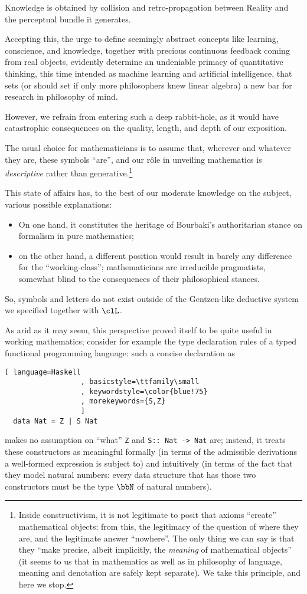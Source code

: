 Knowledge is obtained by collision and retro-propagation between Reality and the perceptual bundle it generates.

Accepting this, the urge to define seemingly abstract concepts like learning, conscience, and knowledge, together with precious continuous feedback coming from real objects, evidently determine an undeniable primacy of quantitative thinking, this time intended as machine learning and artificial intelligence, that sets (or should set if only more philosophers knew linear algebra) a new bar for research in philosophy of mind.

However, we refrain from entering such a deep rabbit-hole, as it would have catastrophic consequences on the quality, length, and depth of our exposition.

The usual choice for mathematicians is to assume that, wherever and whatever they are, these symbols ``are'', and our r\^ole in unveiling mathematics is \emph{descriptive} rather than generative.\footnote{Inside constructivism, it is not legitimate to posit that axioms ``create'' mathematical objects; from this, the legitimacy of the question of where they are, and the legitimate answer ``nowhere''. The only thing we can say is that they ``make precise, albeit implicitly, the \emph{meaning} of mathematical objects'' \cite[]{agazzi} (it seems to us that in mathematics as well as in philosophy of language, meaning and denotation are safely kept separate). We take this principle, and here we stop.}

This state of affairs has, to the best of our moderate knowledge on the subject, various possible explanations:
\begin{itemize}
    \item On one hand, it constitutes the heritage of Bourbaki's authoritarian stance on formalism in pure mathematics;
    \item on the other hand, a different position would result in barely any difference for the ``working-class''; mathematicians are irreducible pragmatists, somewhat blind to the consequences of their philosophical stances.
\end{itemize}
So, symbols and letters do not exist outside of the Gentzen-like deductive system we specified together with $\clL$.

As arid as it may seem, this perspective proved itself to be quite useful in working mathematics; consider for example the type declaration rules of a typed functional programming language: such a concise declaration as
\begin{lstlisting}[ language=Haskell
                  , basicstyle=\ttfamily\small
                  , keywordstyle=\color{blue!75}
                  , morekeywords={S,Z}
                  ]
  data Nat = Z | S Nat
\end{lstlisting}
makes no assumption on ``what'' \verb|Z| and \verb|S:: Nat -> Nat| are; instead, it treats these constructors as meaningful formally (in terms of the admissible derivations a well-formed expression is subject to) and intuitively (in terms of the fact that they model natural numbers: every data structure that has those two constructors must be the type $\bbN$ of natural numbers).

